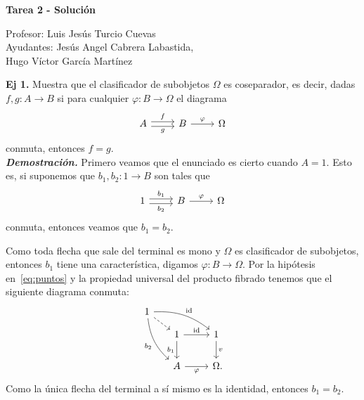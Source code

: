 \documentclass[11pt]{article}
\newcommand{\id}{\mathrm{id}}
\begin{document}
	\begin{center}
		\Huge \textbf{Tarea 2 - Solución}
	\end{center}
    \begin{flushright}
        \footnotesize Profesor: Luis Jesús Turcio Cuevas \\
		Ayudantes: Jesús Angel Cabrera Labastida, \\
		Hugo Víctor García Martínez
	\end{flushright}
    \normalsize

     \textbf{Ej 1.} Muestra que el clasificador de subobjetos \(\Omega\) es coseparador, es decir, dadas \(f,g\colon A\to B\) si para cualquier 
      \(\varphi\colon B\to\Omega\) el diagrama
      \begin{equation}\label{eq:hip}
        \begin{tikzcd}[ampersand replacement=\&]
          A\ar[shift left]{r}{f}\ar[shift right]{r}[swap]{g}\& B\ar{r}{\varphi}\& \Omega      
        \end{tikzcd}
      \end{equation}
      conmuta, entonces \(f = g\). \\

      \textbf{\textit{Demostración.}} Primero veamos que el enunciado es cierto cuando \(A=1\). Esto es, si
  suponemos que \(b_1,b_2\colon 1\to B\) son tales que
  \begin{equation}\label{eq:puntos}
    \begin{tikzcd}[ampersand replacement=\&]
      1\ar[shift left]{r}{b_1}\ar[shift right]{r}[swap]{b_2}\& B\ar{r}{\varphi}\& \Omega     
    \end{tikzcd}
  \end{equation}
  conmuta, entonces veamos que \(b_1 = b_2\).

  Como toda flecha que sale del terminal es mono y \(\Omega\) es clasificador de
  subobjetos, entonces \(b_1\) tiene una característica, digamos 
  \(\varphi\colon B\to\Omega\). Por la hipótesis en~\eqref{eq:puntos} y la propiedad
  universal del producto fibrado tenemos que el siguiente diagrama conmuta:
  \begin{equation*}
    \begin{tikzcd}[ampersand replacement=\&]
      1\ar[bend left=20]{rrd}{\id}\ar[bend right=20]{ddr}[swap]{b_2}
        \ar[dashed]{rd}\\[-2ex]
      \&[-2ex] 1\ar{r}{\id}\ar{d}[swap]{b_1} \& 1\ar{d}{v}\\
      \& A\ar{r}[swap]{\varphi} \& \Omega\mathrlap{.}
    \end{tikzcd}
  \end{equation*}
  Como la única flecha del terminal a sí mismo es la identidad, entonces
  \(b_1 = b_2\).
\end{document}

